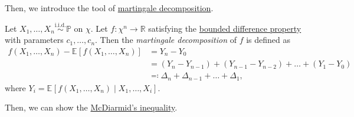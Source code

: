 Then, we introduce the tool of \hyperref[def:martingale-decomposition]{martingale decomposition}.

\begin{definition}\label{def:martingale-decomposition}
	Let \(X_1, \dots , X_n \overset{\text{i.i.d.} }{\sim } \mathbb{P} \) on \(\chi \). Let \(f \colon \chi ^n \to \mathbb{R} \) satisfying the \hyperref[def:bounded-difference-property]{bounded difference property} with parameters \(c_1, \dots , c_n\). Then the \emph{martingale decomposition} of \(f\) is defined as
	\[
		\begin{split}
			f(X_1, \dots , X_n) - \mathbb{E}_{}\left[f(X_1, \dots , X_n) \right]
			&= Y_n - Y_0 \\
			&= (Y_n - Y_{n-1}) + (Y_{n-1} - Y_{n-2}) + \dots + (Y_1 - Y_0) \\
			&\eqqcolon \Delta _n + \Delta _{n-1} + \dots + \Delta _1,
		\end{split}
	\]
	where \(Y_i = \mathbb{E}_{}\left[f(X_1, \dots , X_n) \mid X_1, \dots , X_i \right] \).
\end{definition}

Then, we can show the \hyperref[thm:McDiarmid-inequality]{McDiarmid's inequality}.

